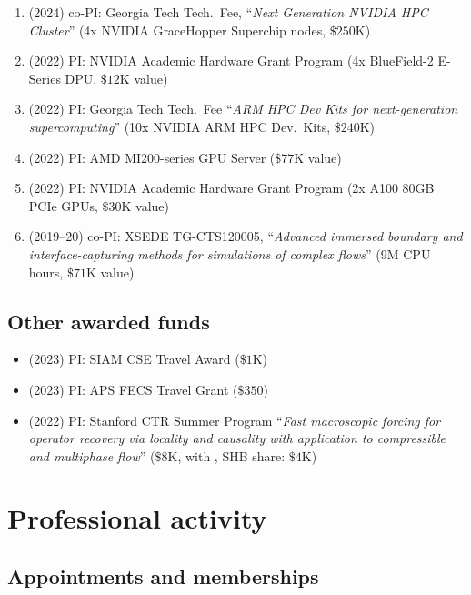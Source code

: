 \begin{enumerate}
    \item (2024) co-PI: Georgia Tech Tech.\ Fee, ``\textit{Next Generation NVIDIA HPC Cluster}'' (4x NVIDIA GraceHopper Superchip nodes, $\$250$K)
    \item (2022) PI: NVIDIA Academic Hardware Grant Program (4x BlueField-2 E-Series DPU, $\$12$K value)
    \item (2022) PI: Georgia Tech Tech.\ Fee ``\textit{ARM HPC Dev Kits for next-generation supercomputing}'' (10x NVIDIA ARM HPC Dev.\ Kits, $\$240$K)
    \item (2022) PI: AMD MI200-series GPU Server ($\$77$K value)
    \item (2022) PI: NVIDIA Academic Hardware Grant Program (2x A100 80GB PCIe GPUs, $\$30$K value)
    \item (2019--20) co-PI: XSEDE TG-CTS120005, ``\textit{Advanced immersed boundary and interface-capturing methods for simulations of complex flows}'' (9M CPU hours, $\$71$K value)
\end{enumerate}

\subsection{Other awarded funds}

\begin{itemize}
    \item (2023) PI: SIAM CSE Travel Award ($\$1$K)
    \item (2023) PI: APS FECS Travel Grant ($\$350$)
    \item (2022) PI: Stanford CTR Summer Program ``\textit{Fast macroscopic forcing for operator recovery via locality and causality with application to compressible and multiphase flow}'' ($\$8$K, with \Florian, SHB share: $\$4$K)
\end{itemize}

% 

\section{Professional activity}

\subsection{Appointments and memberships}

